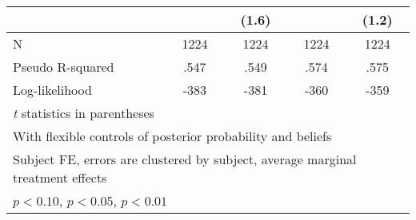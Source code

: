 \begin{table}[htbp]
\begin{tabular}{l*{4}{c}}
                &                  &    (1.6)         &                  &    (1.2)         \\
\hline
N               &     1224         &     1224         &     1224         &     1224         \\
Pseudo R-squared&     .547         &     .549         &     .574         &     .575         \\
Log-likelihood  &     -383         &     -381         &     -360         &     -359         \\
\hline\hline
\multicolumn{5}{l}{\footnotesize \textit{t} statistics in parentheses}\\
\multicolumn{5}{l}{\footnotesize With flexible controls of posterior probability and beliefs}\\
\multicolumn{5}{l}{\footnotesize Subject FE, errors are clustered by subject, average marginal treatment effects}\\
\multicolumn{5}{l}{\footnotesize \sym{*} \(p<0.10\), \sym{**} \(p<0.05\), \sym{***} \(p<0.01\)}\\
\end{tabular}
\end{table}
